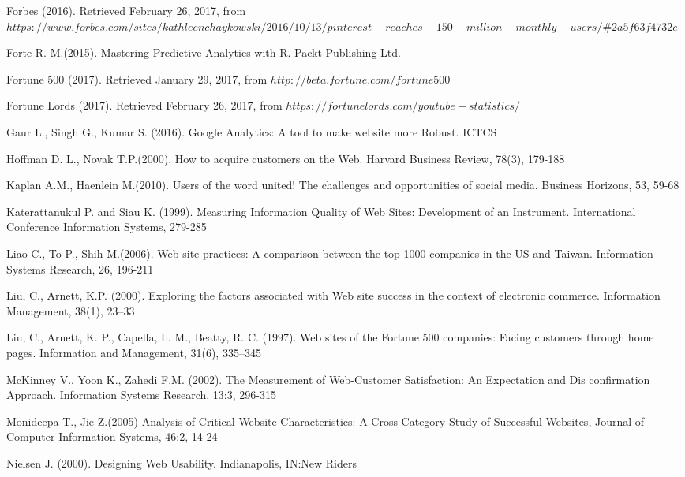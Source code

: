 \documentclass{article}
\begin{document}
\begin{thebibliography}{widest-label}
Forbes (2016). Retrieved February 26, 2017, from $https://www.forbes.com/sites/kathleenchaykowski/2016/10/13/pinterest-reaches-150-million-monthly-users/$\#$2a5f63f4732e$

Forte R. M.(2015). Mastering Predictive Analytics with R. Packt Publishing Ltd.

Fortune 500 (2017). Retrieved January 29, 2017, from $http://beta.fortune.com/fortune500$

Fortune Lords (2017). Retrieved February 26, 2017, from $https://fortunelords.com/youtube-statistics/$

Gaur L., Singh G., Kumar S. (2016). Google Analytics: A tool to make website more Robust. ICTCS

Hoffman D. L., Novak T.P.(2000). How to acquire customers on the Web. Harvard Business Review, 78(3), 179-188

Kaplan A.M., Haenlein M.(2010). Users of the word united! The challenges and opportunities of social media. Business Horizons, 53, 59-68

Katerattanukul P. and Siau K. (1999). Measuring Information Quality of Web Sites: Development of an Instrument. 
International Conference Information Systems, 279-285

 Liao C., To P., Shih M.(2006). Web site practices: A comparison between the top 1000 companies in the US and Taiwan. Information Systems Research, 26, 196-211

 Liu, C., Arnett, K.P. (2000). Exploring the factors associated with Web site success in the context
of electronic commerce. Information Management, 38(1), 23–33

 Liu, C., Arnett, K. P., Capella, L. M., Beatty, R. C. (1997). Web sites of the Fortune 500 companies: Facing customers through home pages. Information and Management, 31(6), 335–345

McKinney V., Yoon K., Zahedi F.M. (2002). The
Measurement of Web-Customer Satisfaction: An Expectation and Dis confirmation Approach. Information Systems Research, 13:3, 296-315

 Monideepa T., Jie Z.(2005) Analysis of Critical Website Characteristics: A Cross-Category Study of Successful Websites, Journal of Computer Information Systems, 46:2, 14-24

Nielsen J. (2000). Designing Web Usability. Indianapolis, IN:New Riders


\end{thebibliography}
\end{document}
